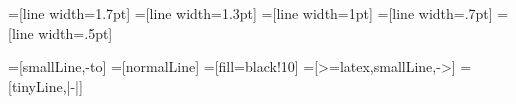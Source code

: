 %
%
%
%







\usetikzlibrary{shapes,arrows}
\usetikzlibrary{positioning}
\usetikzlibrary{shadows}
\usetikzlibrary{backgrounds}
\usetikzlibrary{automata}
\usetikzlibrary{arrows}
\usetikzlibrary{calc}
\usetikzlibrary{patterns}





=[line width=1.7pt]
=[line width=1.3pt]
=[line width=1pt]
=[line width=.7pt]
=[line width=.5pt]


=[smallLine,-to]
=[normalLine]
=[fill=black!10]
=[>=latex,smallLine,->]
=[tinyLine,|-|]



